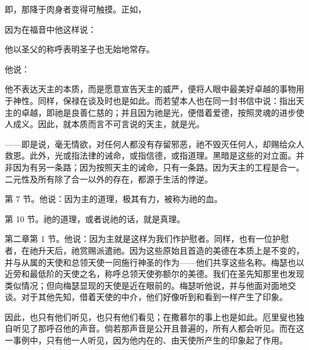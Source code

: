 即，那降于肉身者变得可触摸。正如，\par

因为在福音中他这样说：\par

\par

他以圣父的称呼表明圣子也无始地常存。\par

他说：\par

他不表达天主的本质，而是愿意宣告天主的威严，便将人眼中最美好卓越的事物用于神性。同样，保禄在谈及时也是如此。而若望本人也在同一封书信中说：指出天主的卓越，即祂是良善仁慈的；并且因为祂是光，便借着爱德，按照灵魂的进步使人成义。因此，就本质而言不可言说的天主，就是光。\par

——即是说，毫无情欲，对任何人都没有存留邪恶，祂不毁灭任何人，却赐给众人救恩。此外，光或指法律的诫命，或指信德，或指道理。黑暗是这些的对立面。并非因为有另一条路；因为按照天主的诫命，只有一条路。因为天主的工程是合一。二元性及所有除了合一以外的存在，都源于生活的悖逆。\par

第 7 节。他说：因为主的道理，极其有力，被称为祂的血。\par

第 10 节。祂的道理，或者说祂的话，就是真理。\par

第二章第 1 节。他说：因为主就是这样为我们作护慰者。同样，也有一位护慰者，在祂升天后，祂赏赐派遣祂。因为这些原始且首造的美德在本质上是不变的，并与从属的天使和总领天使一同施行神圣的作为——他们共享这些名称。梅瑟也以近旁和最低阶的天使之名，称呼总领天使弥额尔的美德。我们在圣先知那里也发现类似情况；但向梅瑟显现的天使是近在眼前的。梅瑟听他说，并与他面对面地交谈。对于其他先知，借着天使的中介，他们好像听到和看到一样产生了印象。\par

因此，也只有他们听见，也只有他们看见；在撒慕尔的事上也是如此。厄里叟也独自听见了那呼召他的声音。倘若那声音是公开且普遍的，所有人都会听见。而在这一事例中，只有他一人听见，因为他内在的、由天使所产生的印象起了作用。\par

